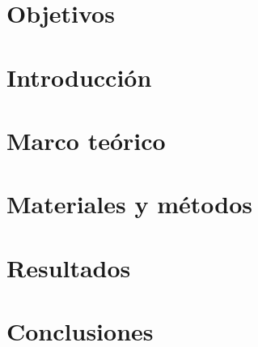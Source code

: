 \documentclass[12pt, letterpaper, spanish, twoside]{article}
\begin{document}
\renewcommand{\tablename}{Tabla}




\tableofcontents
\newpage


\section{Objetivos}


\section{Introducción}


\section{Marco teórico}


\section{Materiales y métodos}


% 

\section{Resultados}


\section{Conclusiones}


\nocite{*}
\renewcommand{\refname}{Referencias bibliográficas}


\end{document}
